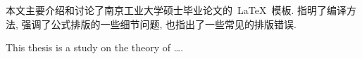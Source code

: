 

\begin{cnabstract}
	
\thispagestyle{onlytitle}

本文主要介绍和讨论了南京工业大学硕士毕业论文的~\LaTeX~模板.
指明了编译方法, 强调了公式排版的一些细节问题, 也指出了一些常见的排版错误.



\end{cnabstract}

\vspace*{10mm} %




\begin{enabstract}
\thispagestyle{onlytitle}
This thesis is a study on the theory of \dots.




\end{enabstract}
\vspace*{10mm} %


